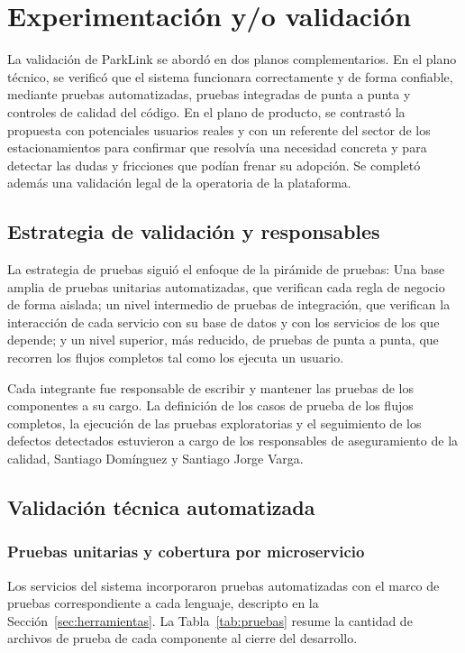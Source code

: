\section{Experimentación y/o validación}\label{sec:validacion}

La validación de ParkLink se abordó en dos planos complementarios. En el plano técnico, se verificó que el sistema funcionara correctamente y de forma confiable, mediante pruebas automatizadas, pruebas integradas de punta a punta y controles de calidad del código. En el plano de producto, se contrastó la propuesta con potenciales usuarios reales y con un referente del sector de los estacionamientos para confirmar que resolvía una necesidad concreta y para detectar las dudas y fricciones que podían frenar su adopción. Se completó además una validación legal de la operatoria de la plataforma.

\subsection{Estrategia de validación y responsables}

La estrategia de pruebas siguió el enfoque de la pirámide de pruebas: Una base amplia de pruebas unitarias automatizadas, que verifican cada regla de negocio de forma aislada; un nivel intermedio de pruebas de integración, que verifican la interacción de cada servicio con su base de datos y con los servicios de los que depende; y un nivel superior, más reducido, de pruebas de punta a punta, que recorren los flujos completos tal como los ejecuta un usuario.

Cada integrante fue responsable de escribir y mantener las pruebas de los componentes a su cargo. La definición de los casos de prueba de los flujos completos, la ejecución de las pruebas exploratorias y el seguimiento de los defectos detectados estuvieron a cargo de los responsables de aseguramiento de la calidad, Santiago Domínguez y Santiago Jorge Varga.

\subsection{Validación técnica automatizada}

\subsubsection{Pruebas unitarias y cobertura por microservicio}

Los servicios del sistema incorporaron pruebas automatizadas con el marco de pruebas correspondiente a cada lenguaje, descripto en la Sección~\ref{sec:herramientas}. La Tabla~\ref{tab:pruebas} resume la cantidad de archivos de prueba de cada componente al cierre del desarrollo.

